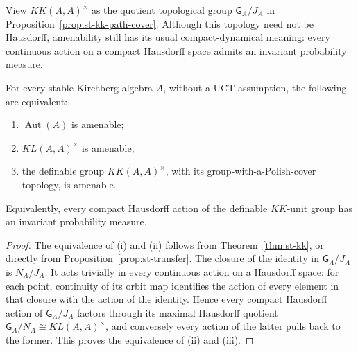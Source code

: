 View $KK(A,A)^\times$ as the quotient topological group $\mathsf G_A/J_A$ in
Proposition~\ref{prop:st-kk-path-cover}. Although this topology need not be
Hausdorff, amenability still has its usual compact-dynamical meaning: every
continuous action on a compact Hausdorff space admits an invariant
probability measure.

\begin{corollary}\label{cor:st-kirchberg-amenability-no-uct}
 For every stable Kirchberg algebra $A$, without a UCT assumption, the following are equivalent:

\begin{enumerate}
\item $\operatorname{Aut}(A)$ is amenable;

\item $KL(A,A)^\times$ is amenable;

\item the definable group $KK(A,A)^\times$, with its
group-with-a-Polish-cover topology, is amenable.
\end{enumerate}

Equivalently, every compact Hausdorff action of the definable $KK$-unit
group has an invariant probability measure.
\end{corollary}

\begin{proof}
The equivalence of (i) and (ii) follows from Theorem~\ref{thm:st-kk}, or
directly from Proposition~\ref{prop:st-transfer}. The closure of the identity
in $\mathsf G_A/J_A$ is $N_A/J_A$. It acts trivially in every continuous action on a
Hausdorff space: for each point, continuity of its orbit map identifies the
action of every element in that closure with the action of the identity.
Hence every compact Hausdorff action of $\mathsf G_A/J_A$ factors through its
maximal Hausdorff quotient $\mathsf G_A/N_A\cong KL(A,A)^\times$, and conversely
every action of the latter pulls back to the former. This proves the
equivalence of (ii) and (iii).
\end{proof}


